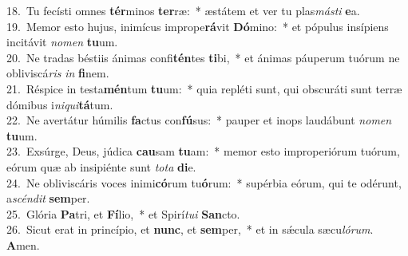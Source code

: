 {18.~}Tu fecísti omnes \textbf{tér}minos \textbf{ter}ræ:~* æstátem et ver tu plas\textit{má}\textit{sti} \textbf{e}a.\\
{19.~}Memor esto hujus, inimícus imprope\textbf{rá}vit \textbf{Dó}mino:~* et pópulus insípiens incitávit \textit{no}\textit{men} \textbf{tu}um.\\
{20.~}Ne tradas béstiis ánimas confi\textbf{tén}tes \textbf{ti}bi,~* et ánimas páuperum tuórum ne obliviscá\textit{ris} \textit{in} \textbf{fi}nem.\\
{21.~}Réspice in testa\textbf{mén}tum \textbf{tu}um:~* quia repléti sunt, qui obscuráti sunt terræ dómibus i\textit{ni}\textit{qui}\textbf{tá}tum.\\
{22.~}Ne avertátur húmilis \textbf{fa}ctus con\textbf{fú}sus:~* pauper et inops laudábunt \textit{no}\textit{men} \textbf{tu}um.\\
{23.~}Exsúrge, Deus, júdica \textbf{cau}sam \textbf{tu}am:~* memor esto improperiórum tuórum, eórum quæ ab insipiénte sunt \textit{to}\textit{ta} \textbf{di}e.\\
{24.~}Ne obliviscáris voces inimi\textbf{có}rum tu\textbf{ó}rum:~* supérbia eórum, qui te odérunt, a\textit{scén}\textit{dit} \textbf{sem}per.\\
{25.~}Glória \textbf{Pa}tri, et \textbf{Fí}lio,~* et Spirí\textit{tu}\textit{i} \textbf{San}cto.\\
{26.~}Sicut erat in princípio, et \textbf{nunc}, et \textbf{sem}per,~* et in sǽcula sæcu\textit{ló}\textit{rum}. \textbf{A}men.\\
